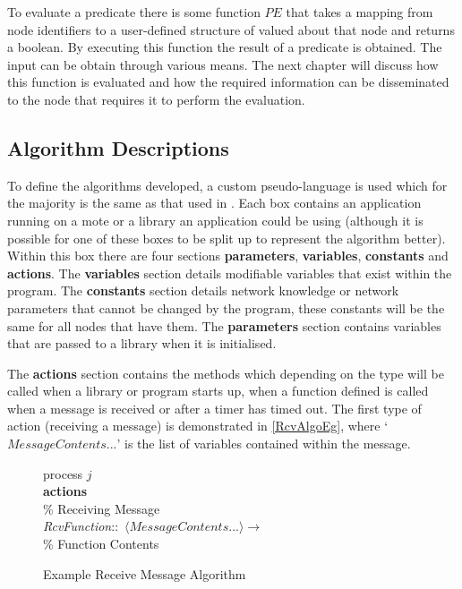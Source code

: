 To evaluate a predicate there is some function $PE$ that takes a mapping from node identifiers to a user-defined structure of valued about that node and returns a boolean. By executing this function the result of a predicate is obtained. The input can be obtain through various means. The next chapter will discuss how this function is evaluated and how the required information can be disseminated to the node that requires it to perform the evaluation.

\subsection{Algorithm Descriptions}

To define the algorithms developed, a custom pseudo-language is used which for the majority is the same as that used in \cite{MSCS310}. Each box contains an application running on a mote or a library an application could be using (although it is possible for one of these boxes to be split up to represent the algorithm better). Within this box there are four sections \textbf{parameters}, \textbf{variables}, \textbf{constants} and \textbf{actions}. The \textbf{variables} section details modifiable variables that exist within the program. The \textbf{constants} section details network knowledge or network parameters that cannot be changed by the program, these constants will be the same for all nodes that have them. The \textbf{parameters} section contains variables that are passed to a library when it is initialised.

The \textbf{actions} section contains the methods which depending on the type will be called when a library or program starts up, when a function defined is called when a message is received or after a timer has timed out. The first type of action (receiving a message) is demonstrated in \autoref{RcvAlgoEg}, where `$MessageContents...$' is the list of variables contained within the message.

\begin{figure}[H]
  \centering
  \begin{boxedminipage}{\linewidth}
    \null process $j$\\
    \null \textbf{actions}\\
    \null\qq \% Receiving Message\\
    \null\qq \emph{RcvFunction}::~$\langle MessageContents...\rangle \rightarrow$\\
    \null\qq\qq \% Function Contents\\
  \end{boxedminipage}
  \caption{Example Receive Message Algorithm}
  \label{RcvAlgoEg}
\end{figure}

